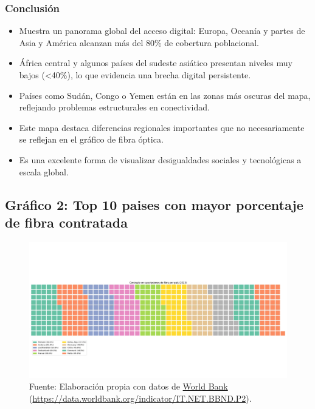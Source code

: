 \documentclass[12pt, a4paper]{article}
\begin{document}
\subsubsection*{Conclusión}
\begin{itemize}
    \item Muestra un panorama global del acceso digital: Europa, Oceanía y partes de Asia y América alcanzan más del 80\% de cobertura poblacional.
    \item África central y algunos países del sudeste asiático presentan niveles muy bajos (<40\%), lo que evidencia una brecha digital persistente.
    \item Países como Sudán, Congo o Yemen están en las zonas más oscuras del mapa, reflejando problemas estructurales en conectividad.
    \item Este mapa destaca diferencias regionales importantes que no necesariamente se reflejan en el gráfico de fibra óptica.
    \item Es una excelente forma de visualizar desigualdades sociales y tecnológicas a escala global.
\end{itemize}

\subsection*{Gráfico 2: Top 10 paises con mayor porcentaje de fibra contratada}
\begin{figure}[H]
    \centering
    \includegraphics[width=1\textwidth]{images/Grafico_fibra_contratada_FC2.png}
    \caption[2]{
        Fuente: Elaboración propia con datos de \href{https://data.worldbank.org}{World Bank} 
        (\url{https://data.worldbank.org/indicator/IT.NET.BBND.P2}). 
    }\end{figure}
\end{document}

